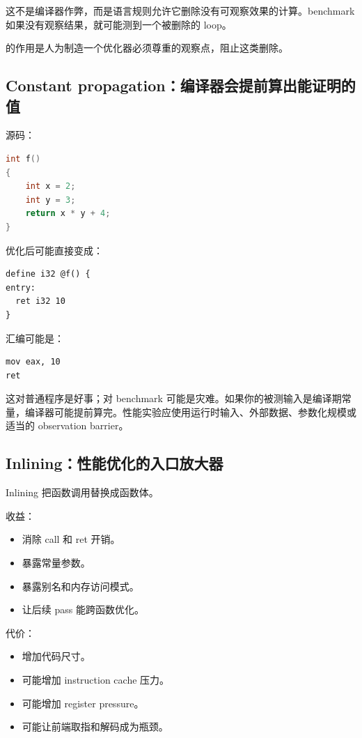 这不是编译器作弊，而是语言规则允许它删除没有可观察效果的计算。benchmark 如果没有观察结果，就可能测到一个被删除的 loop。

 的作用是人为制造一个优化器必须尊重的观察点，阻止这类删除。

\subsection{Constant propagation：编译器会提前算出能证明的值}

源码：

\begin{lstlisting}[language=C++]
int f()
{
    int x = 2;
    int y = 3;
    return x * y + 4;
}
\end{lstlisting}

优化后可能直接变成：

\begin{lstlisting}
define i32 @f() {
entry:
  ret i32 10
}
\end{lstlisting}

汇编可能是：

\begin{lstlisting}
mov eax, 10
ret
\end{lstlisting}

这对普通程序是好事；对 benchmark 可能是灾难。如果你的被测输入是编译期常量，编译器可能提前算完。性能实验应使用运行时输入、外部数据、参数化规模或适当的 observation barrier。

\subsection{Inlining：性能优化的入口放大器}

Inlining 把函数调用替换成函数体。

收益：

\begin{itemize}
  \item 消除 call 和 ret 开销。
  \item 暴露常量参数。
  \item 暴露别名和内存访问模式。
  \item 让后续 pass 能跨函数优化。
\end{itemize}

代价：

\begin{itemize}
  \item 增加代码尺寸。
  \item 可能增加 instruction cache 压力。
  \item 可能增加 register pressure。
  \item 可能让前端取指和解码成为瓶颈。
\end{itemize}

